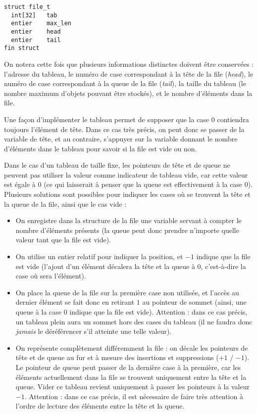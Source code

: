\documentclass[11pt,a4paper]{article}
\begin{document}
\begin{center}
\begin{lstlisting}[style=algorithmique]
struct file_t
  int[32]   tab
  entier    max_len
  entier    head
  entier    tail
fin struct \end{lstlisting}
\end{center}

On notera cette fois que plusieurs informations distinctes doivent être conservées : l'adresse du tableau, le numéro de case correspondant à la tête de la file (\textit{head}), le numéro de case correspondant à la queue de la file (\textit{tail}), la taille du tableau (le nombre maximum d'objets pouvant être stockés), et le nombre d'éléments dans la file.

\medskip

Une façon d'implémenter le tableau permet de supposer que la case $ 0 $ contiendra toujours l'élément de tête.
Dans ce cas très précis, on peut donc se passer de la variable de tête, et au contraire, s'appuyer sur la variable donnant le nombre d'éléments dans le tableau pour savoir si la file est vide ou non.

\medskip

Dans le cas d'un tableau de taille fixe, les pointeurs de tête et de queue ne peuvent pas utiliser la valeur  comme indicateur de tableau vide, car cette valeur est égale à $ 0 $ (ce qui laisserait à penser que la queue est effectivement à la case 0).
Plusieurs solutions sont possibles pour indiquer les cases où se trouvent la tête et la queue de la file, ainsi que le cas vide :

\begin{itemize}
\item On enregistre dans la structure de la file une variable servant à compter le nombre d'éléments présents (la queue peut donc prendre n'importe quelle valeur tant que la file est vide).
\item On utilise un entier relatif pour indiquer la position, et $ -1 $ indique que la file est vide (l'ajout d'un élément décalera la tête et la queue à $ 0 $, c'est-à-dire la case où sera l'élément).
\item On place la queue de la file sur la première case non utilisée, et l'accès au dernier élément se fait donc en retirant $ 1 $ au pointeur de sommet (ainsi, une queue à la case $ 0 $ indique que la file est vide).
Attention : dans ce cas précis, un tableau plein aura un sommet hors des cases du tableau (il ne faudra donc \textit{jamais} le déréférencer s'il atteinte une telle valeur).
\item On représente complètement différemment la file : on décale les pointeurs de tête et de queue au fur et à mesure des insertions et suppressions ($ +1 $ / $ -1 $). Le pointeur de queue peut passer de la dernière case à la première, car les éléments actuellement dans la file se trouvent uniquement entre la tête et la queue.
Vider ce tableau revient uniquement à passer les pointeurs à la valeur $ -1 $.
Attention : dans ce cas précis, il est nécessaire de faire très attention à l'ordre de lecture des éléments entre la tête et la queue.
\end{itemize}
\end{document}
